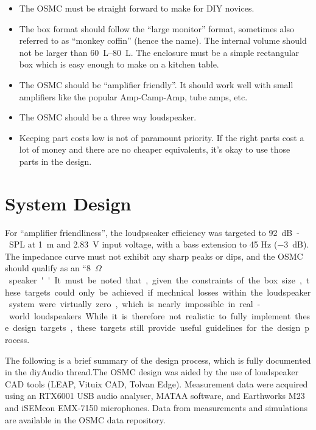 \documentclass[12pt,a4paper]{article}
\begin{document}
\begin{itemize}
\item The OSMC must be straight forward to make for DIY novices.
\item The box format should follow the ``large monitor'' format, sometimes also referred to as ``monkey coffin'' (hence the name). The internal volume should not be larger than \SIrange{60}{80}{L}. The enclosure must be a simple rectangular box which is easy enough to make on a kitchen table.
\item The OSMC should be ``amplifier friendly''. It should work well with small amplifiers like the popular Amp-Camp-Amp, tube amps, etc.
\item The OSMC should be a three way loudspeaker.
\item Keeping part costs low is not of paramount priority. If the right parts cost a lot of money and there are no cheaper equivalents, it's okay to use those parts in the design.
\end{itemize}

\clearpage


\section{System Design}

For ``amplifier friendliness'', the loudpseaker efficiency was targeted to \SI{92}{dB-SPL} at \SI{1}{m} and \SI{2.83}{V} input voltage, with a bass extension to 45 Hz (\SI{-3}{dB}). The impedance curve must not exhibit any sharp peaks or dips, and the OSMC should qualify as an ``\SI{8}{$\Omega$} speaker''. It must be noted that, given the constraints of the box size, these targets could only be achieved if mechnical losses within the loudspeaker system were virtually zero, which is nearly impossible in real-world loudspeakers. While it is therefore not realistic to fully implement these design targets, these targets still provide useful guidelines for the design process.\par

The following is a brief summary of the design process, which is fully documented in the diyAudio thread.\cite{osmc_p1}The OSMC design was aided by the use of loudspeaker CAD tools (LEAP, Vituix CAD, Tolvan Edge). Measurement data were acquired using an RTX6001 USB audio analyser, MATAA software, and Earthworks M23 and iSEMcon EMX-7150 microphones. Data from measurements and simulations are available in the OSMC data repository\cite{osmc_datarepo}.
\end{document}
